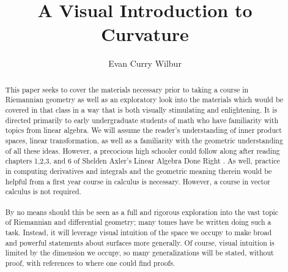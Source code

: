 \documentclass[]{article}
\title{A Visual Introduction to Curvature}
\author{Evan Curry Wilbur}
\newcommand\<{\ensuremath{\left\langle}}
\renewcommand\>{\ensuremath{\right\rangle}}
\theoremstyle{definition}
\theoremstyle{definition}
\begin{document}
	\maketitle
	\begin{abstract}
		\indent
		This paper seeks to cover the materials necessary prior to taking a course in Riemannian geometry as well as an exploratory look into the materials which would be covered in that class in a way that is both visually stimulating and enlightening. It is directed primarily to early undergraduate students of math who have familiarity with topics from linear algebra. We will assume the reader's understanding of inner product spaces, linear transformation, as well as a familiarity with the geometric understanding of all these ideas. However, a precocious high schooler could follow along after reading chapters 1,2,3, and 6 of Shelden Axler's Linear Algebra Done Right \cite{Axler2024}. As well, practice in computing derivatives and integrals and the geometric meaning therein would be helpful from a first year course in calculus is necessary. However, a course in vector calculus is not required.
		\\
		\\
		\indent
		By no means should this be seen as a full and rigorous exploration into the vast topic of Riemannian and differential geometry; many tomes have be written doing such a task. Instead, it will leverage visual intuition of the space we occupy to make broad and powerful statements about surfaces more generally. Of course, visual intuition is limited by the dimension we occupy, so many generalizations will be stated, without proof, with references to where one could find proofs.
	\end{abstract}
\end{document}
